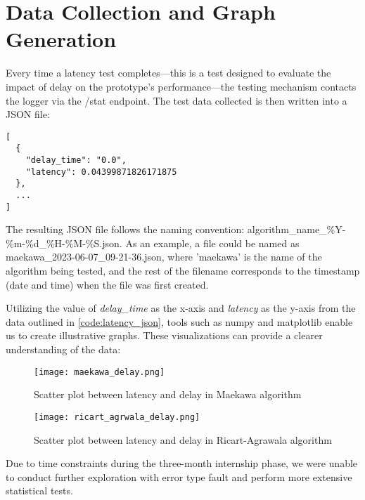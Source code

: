 \section{Data Collection and Graph Generation}

Every time a latency test completes—this is a test designed to evaluate the impact 
of delay on the prototype's performance—the testing mechanism contacts the logger 
via the /stat endpoint. The test data collected is then written into a JSON file:
  
\begin{listing}[H]
  \begin{verbatim}
[
  {
    "delay_time": "0.0",
    "latency": 0.04399871826171875
  },
  ...
]
  \end{verbatim}
  \caption{Latency data obtain from the logger}
  \label{code:latency_json}
\end{listing}

The resulting JSON file follows the naming convention: algorithm\_name\_\%Y-\%m-\%d\_\%H-\%M-\%S.json. As an example, a file could be named as maekawa\_2023-06-07\_09-21-36.json, where 'maekawa' is the name of the algorithm being tested, and the rest of the filename corresponds to the timestamp (date and time) when the file was first created.

Utilizing the value of \textit{delay\_time} as the x-axis and \textit{latency} 
as the y-axis from the data outlined in \ref{code:latency_json}, tools such as 
numpy and matplotlib enable us to create illustrative graphs. These visualizations can provide a clearer understanding of the data:

\begin{figure}[htbp]
  \centering
  \texttt{[image: maekawa\_delay.png]}
  \caption{Scatter plot between latency and delay in Maekawa algorithm}
\end{figure}

\begin{figure}[htbp]
  \centering
  \texttt{[image: ricart\_agrwala\_delay.png]}
  \caption{Scatter plot between latency and delay in Ricart-Agrawala algorithm}
\end{figure}

Due to time constraints during the three-month internship phase, we were unable 
to conduct further exploration with error type fault and perform more extensive statistical tests.
